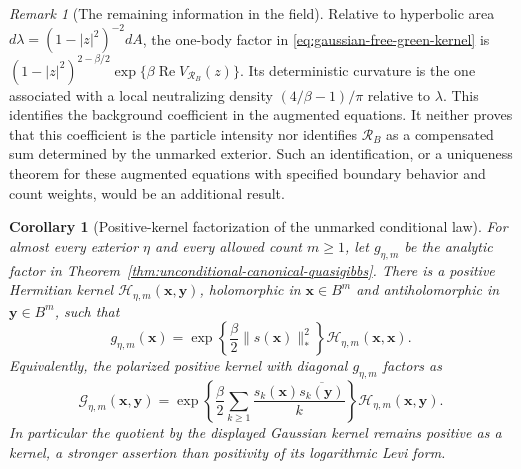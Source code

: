 \documentclass[11pt,a4paper]{article}
\numberwithin{equation}{section}
\newtheorem{corollary}[theorem]{Corollary}
\theoremstyle{definition}
\theoremstyle{remark}
\newtheorem{remark}[theorem]{Remark}
\begin{document}
\begin{remark}[The remaining information in the field]
Relative to hyperbolic area $d\lambda=(1-|z|^2)^{-2}dA$, the one-body
factor in \eqref{eq:gaussian-free-green-kernel} is
$(1-|z|^2)^{2-\beta/2}\exp\{\beta\operatorname{Re}V_{\mathcal R_B}(z)\}$.
Its deterministic curvature is the one associated with a local
neutralizing density $(4/\beta-1)/\pi$ relative to $\lambda$.
This identifies the background coefficient in the augmented equations.
It neither proves that this coefficient is the particle intensity nor
identifies $\mathcal R_B$ as a compensated sum determined by the
unmarked exterior. Such an identification, or a uniqueness theorem for
these augmented equations with specified boundary behavior and count
weights, would be an additional result.
\end{remark}

\begin{corollary}[Positive-kernel factorization of the unmarked conditional law]
\label{cor:gaussian-divisible-conditional-kernel}
For almost every exterior $\eta$ and every allowed count $m\ge1$, let
$g_{\eta,m}$ be the analytic factor in
Theorem~\ref{thm:unconditional-canonical-quasigibbs}. There is a positive
Hermitian kernel $\mathcal H_{\eta,m}(\mathbf x,\mathbf y)$, holomorphic
in $\mathbf x\in B^m$ and antiholomorphic in $\mathbf y\in B^m$, such that
\begin{equation}\label{eq:gaussian-divisible-diagonal-factor}
 g_{\eta,m}(\mathbf x)
 =\exp\left\{\frac\beta2\|s(\mathbf x)\|_*^2\right\}
                  \mathcal H_{\eta,m}(\mathbf x,\mathbf x).
\end{equation}
Equivalently, the polarized positive kernel with diagonal
$g_{\eta,m}$ factors as
\begin{equation}\label{eq:gaussian-divisible-kernel-factor}
 \mathcal G_{\eta,m}(\mathbf x,\mathbf y)
 =\exp\left\{\frac\beta2\sum_{k\ge1}
       \frac{s_k(\mathbf x)\overline{s_k(\mathbf y)}}k\right\}
                         \mathcal H_{\eta,m}(\mathbf x,\mathbf y).
\end{equation}
In particular the quotient by the displayed Gaussian kernel remains
positive as a kernel, a stronger assertion than positivity of its
logarithmic Levi form.
\end{corollary}
\end{document}
